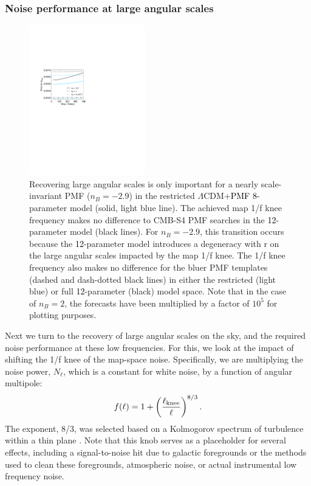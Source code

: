 \documentclass[apj]{emulateapj}
\newcommand{\lcdm}{\ensuremath{\Lambda}CDM}
\newcommand{\be}{\begin{equation}}
\newcommand{\ee}{\end{equation}}
\newcommand{\changed}[1]{\textcolor{Black}{#1}}
\begin{document}
\subsubsection{Noise performance at large angular scales}

\begin{figure}[htb]\centering
\includegraphics[width=0.45\textwidth,clip,trim={2.cm 12.5cm 11cm 7.5cm}]{pmf_knee.pdf}
  \caption[Map knee dependence]{
  Recovering large angular scales is only important for a nearly scale-invariant PMF ($n_B = -2.9$) in the restricted \lcdm{}+\changed{PMF 8}-parameter model (solid, light blue line). 
The achieved map 1/f knee frequency makes no difference to CMB-S4 PMF searches in the \changed{12}-parameter model (black lines). 
  For $n_B=-2.9$, this transition occurs because the \changed{12}-parameter model introduces a degeneracy with r on the large angular scales impacted by the map 1/f knee. 
  The 1/f knee frequency also makes no difference for the bluer PMF templates  (dashed and dash-dotted black lines) in either the restricted (light blue) or full \changed{12}-parameter (black) model space. 
     Note that in the case of $n_B=2$, the forecasts have been multiplied by a factor of $10^5$ for plotting purposes. 
    \label{fig:knee}
  }
\end{figure}

Next we turn to the recovery of large angular scales on the sky, and the required noise performance at these low frequencies. 
For this, we look at the impact of shifting the 1/f knee of the map-space noise. 
Specifically, we are multiplying the noise power, $N_\ell$, which is a constant for white noise,  by a function of angular multipole:
\be \label{eqn:knee}
f(\ell) = 1 + \left(\frac{\ell_{\rm knee}}{\ell}\right)^{8/3}.
\ee 
The exponent, 8/3, was selected based on a Kolmogorov spectrum of turbulence within a thin plane \citep{lay00}. %
Note that this knob  serves as a placeholder for several effects, including a signal-to-noise hit due to galactic foregrounds or the methods used to clean these foregrounds, atmospheric noise, or actual instrumental low frequency noise. 
\end{document}
